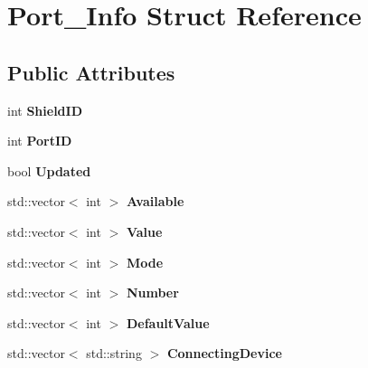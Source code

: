 \hypertarget{structPort__Info}{}\section{Port\+\_\+\+Info Struct Reference}
\label{structPort__Info}
\subsection*{Public Attributes}
\begin{DoxyCompactItemize}
\item 
\mbox{\label{structPort__Info_aee246c5133ea8e72593853078671bdae}} 
int {\bfseries Shield\+ID}
\item 
\mbox{\label{structPort__Info_a3260b2bac1978496c13192934264a2d3}} 
int {\bfseries Port\+ID}
\item 
\mbox{\label{structPort__Info_a175d5c7e6ebfb88aec355185bca6e1ca}} 
bool {\bfseries Updated}
\item 
\mbox{\label{structPort__Info_ac94547c5ad07b6429a4cb31a4fb4db2d}} 
std\+::vector$<$ int $>$ {\bfseries Available}
\item 
\mbox{\label{structPort__Info_aed39b43de77085c4a736fb5d9dae65df}} 
std\+::vector$<$ int $>$ {\bfseries Value}
\item 
\mbox{\label{structPort__Info_a082d13744400c3ffe0071dd3f8e35ec0}} 
std\+::vector$<$ int $>$ {\bfseries Mode}
\item 
\mbox{\label{structPort__Info_a35e9589ab8a1b2766e69972b59226f9b}} 
std\+::vector$<$ int $>$ {\bfseries Number}
\item 
\mbox{\label{structPort__Info_a317ff4d71a5d1ae7cfe874c4834c0959}} 
std\+::vector$<$ int $>$ {\bfseries Default\+Value}
\item 
\mbox{\label{structPort__Info_a706f8fccaef063d388d816744d01f7ec}} 
std\+::vector$<$ std\+::string $>$ {\bfseries Connecting\+Device}
\item 
\mbox{\label{structPort__Info_ab5778f4e3532d99dc1114ad4228239f1}} 

\end{DoxyCompactItemize}
